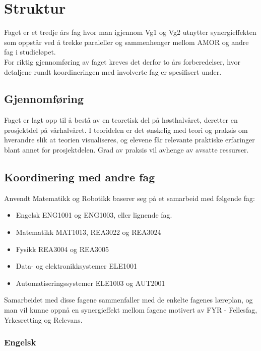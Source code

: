 \section*{Struktur} \label{Sec: Struktur}

	Faget er et tredje års fag hvor man igjennom Vg1 og Vg2 utnytter synergieffekten som oppstår ved å trekke paraleller og sammenhenger mellom AMOR og andre fag i studieløpet.\\
	For riktig gjennomføring av faget kreves det derfor to års forberedelser, hvor detaljene rundt koordineringen med involverte fag er spesifisert under.

	\subsection*{Gjennomføring}

	Faget er lagt opp til å bestå av en teoretisk del på høsthalvåret, deretter en prosjektdel på vårhalvåret. I teoridelen er det ønskelig med teori og praksis om hverandre slik at teorien visualiseres, og elevene får relevante praktiske erfaringer blant annet for prosjektdelen. Grad av praksis vil avhenge av avsatte ressurser.



	\subsection*{Koordinering med andre fag}

	Anvendt Matematikk og Robotikk baserer seg på et samarbeid med følgende fag:

	\begin{itemize}
	\item Engelsk ENG1001 og ENG1003, eller lignende fag.
	\item Matematikk MAT1013, REA3022 og REA3024
	\item Fysikk REA3004 og REA3005
	\item Data- og elektronikksystemer ELE1001
	\item Automatiseringssystemer ELE1003 og AUT2001
	\end{itemize}

	Samarbeidet med disse fagene sammenfaller med de enkelte fagenes læreplan,
	og man vil kunne oppnå en synergieffekt mellom fagene motivert av FYR - Fellesfag, Yrkesretting og Relevans.\\


	\subsubsection*{Engelsk}


